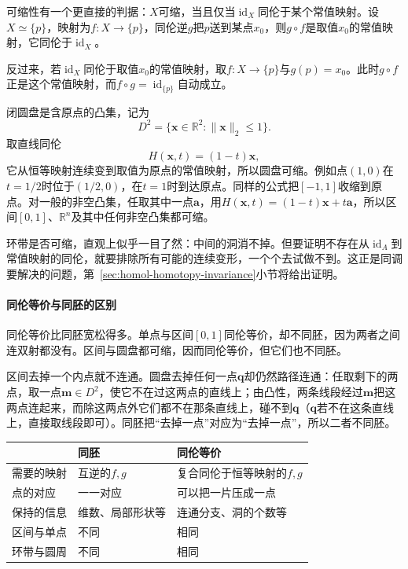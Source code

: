 可缩性有一个更直接的判据：$X$可缩，当且仅当$\operatorname{id}_X$同伦于某个常值映射。设$X\simeq\{p\}$，映射为$f:X\to\{p\}$，同伦逆$g$把$p$送到某点$x_0$，则$g\circ f$是取值$x_0$的常值映射，它同伦于$\operatorname{id}_X$。

反过来，若$\operatorname{id}_X$同伦于取值$x_0$的常值映射，取$f:X\to\{p\}$与$g(p)=x_0$。此时$g\circ f$正是这个常值映射，而$f\circ g=\operatorname{id}_{\{p\}}$自动成立。

\begin{example}[区间与圆盘可缩]
\label{ex:homol-contractible}
闭圆盘是含原点的凸集，记为
\[
 D^2=\{\bm x\in\mathbb R^2:\lVert\bm x\rVert_2\leq1\}.
\]
取直线同伦
\[
 H(\bm x,t)=(1-t)\bm x,
\]
它从恒等映射连续变到取值为原点的常值映射，所以圆盘可缩。例如点$(1,0)$在$t=1/2$时位于$(1/2,0)$，在$t=1$时到达原点。同样的公式把$[-1,1]$收缩到原点。对一般的非空凸集，任取其中一点$\bm a$，用$H(\bm x,t)=(1-t)\bm x+t\bm a$，所以区间$[0,1]$、$\mathbb R^n$及其中任何非空凸集都可缩。
\end{example}

环带是否可缩，直观上似乎一目了然：中间的洞消不掉。但要证明不存在从$\operatorname{id}_A$到常值映射的同伦，就要排除所有可能的连续变形，一个个去试做不到。这正是同调要解决的问题，第~\ref{sec:homol-homotopy-invariance}小节将给出证明。

\paragraph{同伦等价与同胚的区别}
同伦等价比同胚宽松得多。单点与区间$[0,1]$同伦等价，却不同胚，因为两者之间连双射都没有。区间与圆盘都可缩，因而同伦等价，但它们也不同胚。

区间去掉一个内点就不连通。圆盘去掉任何一点$\bm q$却仍然路径连通：任取剩下的两点，取一点$\bm m\in D^2$，使它不在过这两点的直线上；由凸性，两条线段经过$\bm m$把这两点连起来，而除这两点外它们都不在那条直线上，碰不到$\bm q$（$\bm q$若不在这条直线上，直接取线段即可）。同胚把“去掉一点”对应为“去掉一点”，所以二者不同胚。

\begin{BookInlineTable}
  \centering
  \caption{同胚与同伦等价的比较}
  \label{tab:homol-homeo-vs-homotopy}
  \begin{tabular}{lll}
    \toprule
    & 同胚 & 同伦等价 \\
    \midrule
    需要的映射 & 互逆的$f,g$ & 复合同伦于恒等映射的$f,g$ \\
    点的对应 & 一一对应 & 可以把一片压成一点 \\
    保持的信息 & 维数、局部形状等 & 连通分支、洞的个数等 \\
    区间与单点 & 不同 & 相同 \\
    环带与圆周 & 不同 & 相同 \\
    \bottomrule
  \end{tabular}
\end{BookInlineTable}

